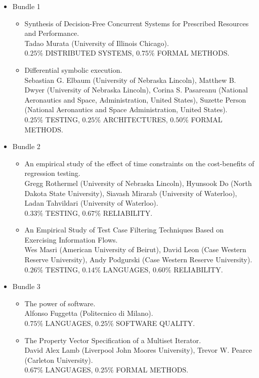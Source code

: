 \begin{small}
  \begin{itemize}
    \item Bundle 1
    \begin{itemize}
      \item Synthesis of Decision-Free Concurrent Systems for Prescribed Resources and Performance.\\
      Tadao Murata (University of Illinois Chicago).\\
      $0.25\%$ DISTRIBUTED SYSTEMS, $0.75\%$ FORMAL METHODS.
      \item Differential symbolic execution.\\
      Sebastian G. Elbaum (University of Nebraska Lincoln), Matthew B. Dwyer (University of Nebraska Lincoln), Corina S. Pasareanu (National Aeronautics and Space, Administration, United States), Suzette Person (National Aeronautics and Space Administration, United States).\\
      $0.25\%$ TESTING, $0.25\%$ ARCHITECTURES, $0.50\%$ FORMAL METHODS.
    \end{itemize}
    \item Bundle 2
    \begin{itemize}
      \item An empirical study of the effect of time constraints on the cost-benefits of regression testing.\\
      Gregg Rothermel (University of Nebraska Lincoln), Hyunsook Do (North Dakota State University), Siavash Mirarab (University of Waterloo), Ladan Tahvildari (University of Waterloo).\\
      $0.33\%$ TESTING, $0.67\%$ RELIABILITY.
      \item An Empirical Study of Test Case Filtering Techniques Based on Exercising Information Flows.\\
      Wes Masri (American University of Beirut), David Leon (Case Western Reserve University), Andy Podgurski (Case Western Reserve University).\\
      $0.26\%$ TESTING, $0.14\%$ LANGUAGES, $0.60\%$ RELIABILITY.
    \end{itemize}
    \item Bundle 3
    \begin{itemize}
      \item The power of software.\\
      Alfonso Fuggetta (Politecnico di Milano). \\
      $0.75\%$ LANGUAGES, $0.25\%$ SOFTWARE QUALITY.
      \item The Property Vector Specification of a Multiset Iterator.\\
      David Alex Lamb (Liverpool John Moores University), Trevor W. Pearce (Carleton University).\\
      $0.67\%$ LANGUAGES, $0.25\%$ FORMAL METHODS.
    \end{itemize}
  \end{itemize}
\end{small}